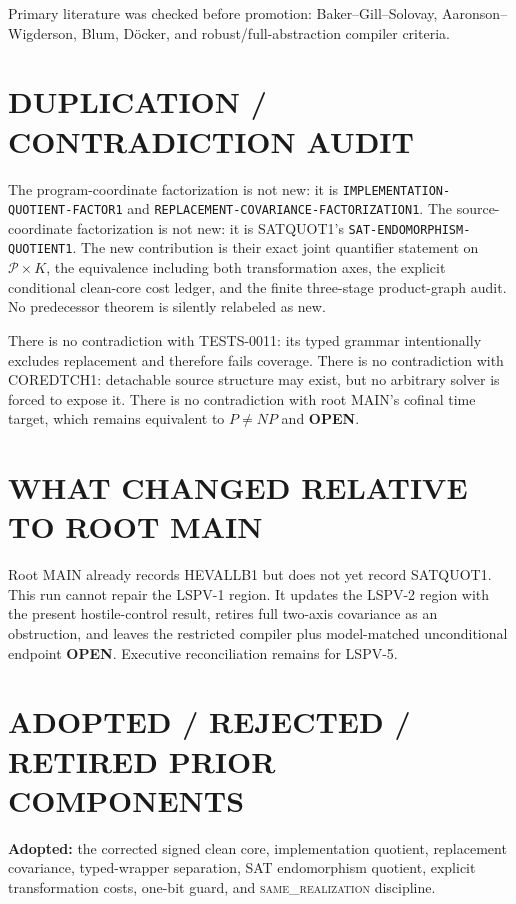 \documentclass[11pt]{article}
\newcommand{\OPEN}{\textbf{OPEN}}
\newcommand{\same}{\textsc{same\_realization}}
\begin{document}
Primary literature was checked before promotion: Baker--Gill--Solovay,
Aaronson--Wigderson, Blum, D\"ocker, and robust/full-abstraction compiler
criteria.

\section{DUPLICATION / CONTRADICTION AUDIT}

The program-coordinate factorization is not new: it is
\texttt{IMPLEMENTATION-QUOTIENT-FACTOR1} and
\texttt{REPLACEMENT-COVARIANCE-FACTORIZATION1}.  The source-coordinate
factorization is not new: it is SATQUOT1's
\texttt{SAT-ENDOMORPHISM-QUOTIENT1}.  The new contribution is their exact
joint quantifier statement on $\mathcal P\times K$, the equivalence including
both transformation axes, the explicit conditional clean-core cost ledger,
and the finite three-stage product-graph audit.  No predecessor theorem is
silently relabeled as new.

There is no contradiction with TESTS-0011: its typed grammar intentionally
excludes replacement and therefore fails coverage.  There is no contradiction
with COREDTCH1: detachable source structure may exist, but no arbitrary solver
is forced to expose it.  There is no contradiction with root MAIN's cofinal
time target, which remains equivalent to $P\ne NP$ and \OPEN.

\section{WHAT CHANGED RELATIVE TO ROOT MAIN}

Root MAIN already records HEVALLB1 but does not yet record SATQUOT1.  This run
cannot repair the LSPV-1 region.  It updates the LSPV-2 region with the present
hostile-control result, retires full two-axis covariance as an obstruction,
and leaves the restricted compiler plus model-matched unconditional endpoint
\OPEN.  Executive reconciliation remains for LSPV-5.

\section{ADOPTED / REJECTED / RETIRED PRIOR COMPONENTS}

\textbf{Adopted:} the corrected signed clean core, implementation quotient,
replacement covariance, typed-wrapper separation, SAT endomorphism quotient,
explicit transformation costs, one-bit guard, and \same{} discipline.
\end{document}
